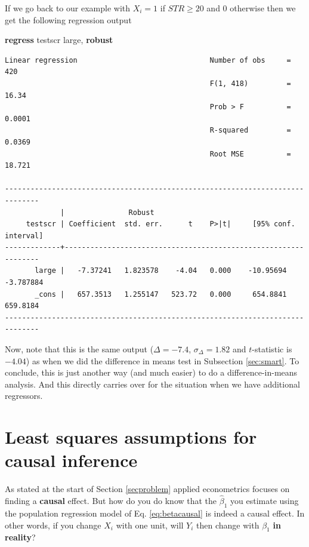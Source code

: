 \documentclass[
]{book}
\newenvironment{Shaded}{\begin{snugshade}}{\end{snugshade}}
\newcommand{\KeywordTok}[1]{\textcolor[rgb]{0.13,0.29,0.53}{\textbf{#1}}}
\newcommand{\NormalTok}[1]{#1}
\begin{document}
If we go back to our example with \(X_i = 1\) if \(STR \geq 20\) and 0 otherwise then we get the following regression output

\begin{Shaded}
\begin{Highlighting}[]
\KeywordTok{regress}\NormalTok{ testscr large, }\KeywordTok{robust}
\end{Highlighting}
\end{Shaded}

\begin{verbatim}
Linear regression                               Number of obs     =        420
                                                F(1, 418)         =      16.34
                                                Prob > F          =     0.0001
                                                R-squared         =     0.0369
                                                Root MSE          =     18.721

------------------------------------------------------------------------------
             |               Robust
     testscr | Coefficient  std. err.      t    P>|t|     [95% conf. interval]
-------------+----------------------------------------------------------------
       large |   -7.37241   1.823578    -4.04   0.000    -10.95694   -3.787884
       _cons |   657.3513   1.255147   523.72   0.000     654.8841    659.8184
------------------------------------------------------------------------------
\end{verbatim}

Now, note that this is the same output (\(\Delta= -7.4\), \(\sigma_\Delta = 1.82\) and \(t\)-statistic is \(-4.04\)) as when we did the difference in means test in Subsection \ref{sec:smart}. To conclude, this is just another way (and much easier) to do a difference-in-means analysis. And this directly carries over for the situation when we have additional regressors.

\hypertarget{least-squares-assumptions-for-causal-inference}{%
\section{Least squares assumptions for causal inference}\label{least-squares-assumptions-for-causal-inference}}

As stated at the start of Section \ref{secproblem} applied econometrics focuses on finding a \textbf{causal} effect. But how do you do know that the \(\hat{\beta}_1\) you estimate using the population regression model of Eq. \eqref{eq:betacausal} is indeed a causal effect. In other words, if you change \(X_i\) with one unit, will \(Y_i\) then change with \(\beta_1\) \textbf{in reality}?
\end{document}
